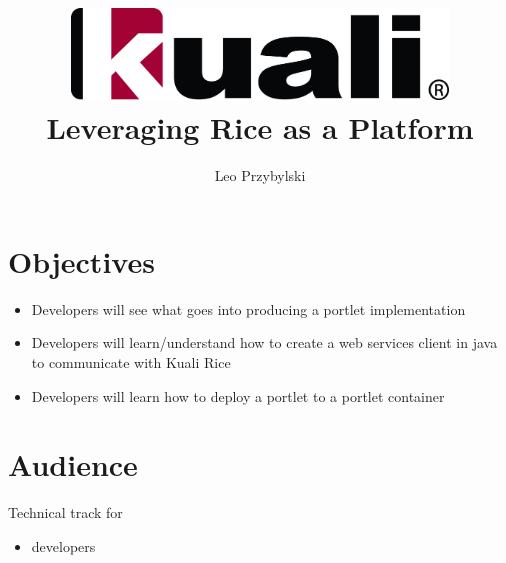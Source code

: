 \documentclass[12pt,notitlepage]{article}
\author{Leo Przybylski}
\title{\includegraphics[width=0.75\textwidth]{kuali_base.png}\\Leveraging
Rice as a Platform}
\date{}
\begin{document}
\maketitle
{}
\section{Objectives}
\begin{itemize}
\item Developers will see what goes into producing a portlet implementation
\item Developers will learn/understand how to create a web services client in java to communicate with Kuali Rice
\item Developers will learn how to deploy a portlet to a portlet
  container
\end{itemize}

\section{Audience}
Technical track for
\begin{itemize}
\item developers
\end{itemize}
\end{document}
